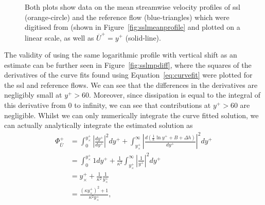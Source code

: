 \begin{figure}[htbp]
	\centering
		\caption[Mean streamwise velocity profiles of SSL and reference flows, and analytical approximations thereof]{Both plots show data on the mean streamwise velocity profiles of \gls*{ssl} (orange-circle) and the reference flow (blue-triangles) which were digitised from \textcite{viotti2009} (shown in Figure~\ref{fig:sslmeanprofile} and plotted on a linear scale, as well as $\overline{U}^+=y^+$ (solid-line). }
	\label{fig:sslmplin}
\end{figure}
The validity of using the same logarithmic profile with vertical shift as an estimate can be further seen in Figure~\ref{fig:sslmpdiff}, where the squares of the derivatives of the curve fits found using Equation~\eqref{eq:curvefit} were plotted for the \gls*{ssl} and reference flows. We can see that the differences in the derivatives are negligibly small at $y^{+}>60$. Moreover, since dissipation is equal to the integral of this derivative from 0 to infinity, we can see that contributions at $y^{+}>60$ are negligible. Whilst we can only numerically integrate the curve fitted solution, we can actually analytically integrate the estimated solution as
\begin{align}
	\Phi _{\overline{U}}^{+} &= \int_{0}^{y_{\times}^{+}} \left| \frac{dy^{+}}{dy^{+}} \right|^2dy^{+} + \int_{y_{\times}^{+}}^{\infty} \left| \frac{d\left( \frac{1}{\kappa}\ln y^{+} +B+\Delta h\right) }{dy^{+}} \right|^2dy^{+}  \\
	&= \int_{0}^{y_{\times}^{+}} 1dy^{+} + \frac{1}{\kappa^2}\int_{y_{\times}^{+}}^{\infty} \left| \frac{1}{y^{+}} \right|^2dy^{+}  \\
	&= y_{\times}^{+} + \frac{1}{\kappa^2}\frac{1}{y_{\times}^{+}}\\
	&=\frac{\left(  \kappa y_{\times}^{+}  \right) ^2+ 1}{\kappa^2 y_{\times}^{+}}\label{eq:fiycross}
,\end{align}
